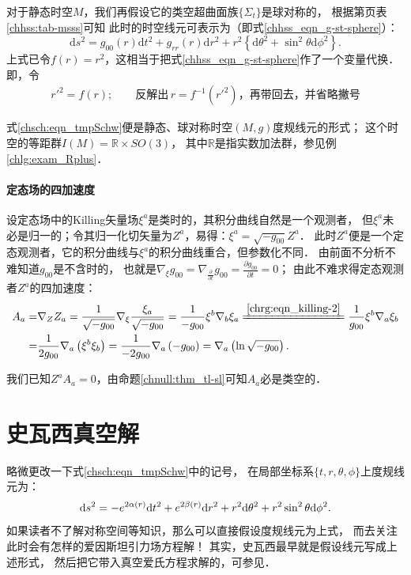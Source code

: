 对于静态时空$M$，我们再假设它的类空超曲面族$\{\Sigma_t\}$是球对称的，
根据第\pageref{chhss:tab-msss}页表\ref{chhss:tab-msss}可知
此时的时空线元可表示为（即式\eqref{chhss_eqn_g-st-sphere}）：
\begin{equation}\label{chsch:eqn_tmpSchw}
    \mathrm{d} s^2=  g_{00}(r) \mathrm{d} t^2+g_{r r}(r) \mathrm{d} r^2 
    +r^2\left\{\mathrm{d} \theta^2+\sin ^2 \theta \mathrm{d} \phi^2\right\} .
\end{equation}
上式已令$f(r)=r^2$，这相当于把式\eqref{chhss_eqn_g-st-sphere}作了一个变量代换．即，令
\begin{align*}
    r'^2 = f(r);\qquad \text{反解出} \, r=f^{-1}(r'^2) \text{，再带回去，并省略撇号}
\end{align*}

式\eqref{chsch:eqn_tmpSchw}便是静态、球对称时空$(M,g)$度规线元的形式；
这个时空的等距群$I(M)=\mathbb{R}\times SO(3)$，
其中$\mathbb{R}$是指实数加法群，参见例\ref{chlg:exam_Rplus}．



\paragraph{定态场的四加速度}

设定态场中的Killing矢量场$\xi^a$是{\kaishu 类时}的，其积分曲线自然是一个观测者，
但$\xi^a$未必是归一的；令其归一化切矢量为$Z^a$，易得：$\xi^a=\sqrt{-g_{00}}Z^a$．
此时$Z^a$便是一个定态观测者，它的积分曲线与$\xi^a$的积分曲线重合，但参数化不同．
由前面不分析不难知道$g_{00}$是不含时的，
也就是$\nabla_\xi g_{00}=\nabla_{\frac{\partial}{\partial t}}g_{00}
=\frac{\partial g_{00}}{\partial t}=0$；
由此不难求得定态观测者$Z^a$的四加速度：
\begin{align}
    A_a =& \nabla_Z Z_a = \frac{1}{\sqrt{-g_{00}}} \nabla_\xi \frac{\xi_a}{\sqrt{-g_{00}}}
    = \frac{1}{-g_{00}} \xi^b\nabla_b \xi_a  \xlongequal{\ref{chrg:eqn_killing-2}}
    \frac{1}{g_{00}} \xi^b\nabla_a \xi_b \notag \\
    =& \frac{1}{2 g_{00}} \nabla_a \left(\xi^b \xi_b\right)
    =\frac{1}{-2 g_{00}} \nabla_a \left(- g_{00} \right)
    =\nabla_a \left(\ln \sqrt{- g_{00}} \right) . \label{chsch:eqn_A-stationary}
\end{align}

我们已知$Z^a A_a=0$，由命题\ref{chnull:thm_tl-sl}可知$A_a$必是类空的．



\section{史瓦西真空解}
略微更改一下式\eqref{chsch:eqn_tmpSchw}中的记号，
在局部坐标系$\{t,r,\theta,\phi\}$上度规线元为：
\begin{equation}\label{chsch:eqn_Schw-metric-raw}
    {\rm d}s^2 = -e^{2 \alpha(r)} {\rm d}t^2 + e^{2 \beta(r)} {\rm d}r^2
      + r^2 {\rm d}\theta^2 + r^2 \sin^2\theta {\rm d}\phi^2 .
\end{equation}
如果读者不了解对称空间等知识，那么可以直接假设度规线元为上式，
而去关注此时会有怎样的爱因斯坦引力场方程解！
其实，史瓦西最早就是假设线元写成上述形式，
然后把它带入真空爱氏方程求解的，可参见\parencite{schwarzschild-1999}．



